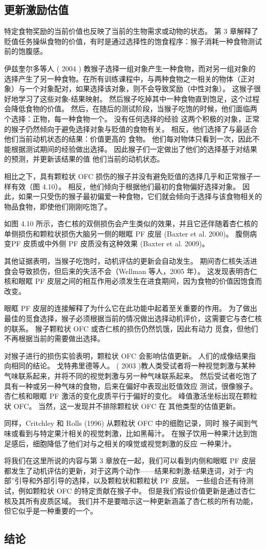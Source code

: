 \subsection{更新激励估值}
特定食物奖励的当前价值也反映了当前的生物需求或动物的状态。 第 3 章解释了贬值任务操纵食物的价值，有时是通过选择性的饱食程序：猴子消耗一种食物测试前的饱腹感。\par
伊兹奎尔多等人 ( 2004 ) 教猴子选择一组对象产生一种食物，而对另一组对象的选择产生了另一种食物。在所有训练课程中，与两种食物之一相关的物体（正对象）与一个对象配对，如果选择该对象，则不会导致奖励（中性对象）。 这猴子很好地学习了这些对象-结果映射。 然后猴子吃掉其中一种食物直到饱足，这个过程会降低食物的价值。 然后，在随后的测试阶段，当猴子吃饱的时候，他们面临两个选择：正物，每一种食物一个。 没有任何选择的经验
这两个积极的对象，正常的猴子仍然倾向于避免选择对象与贬值的食物有关。 相反，他们选择了与最适合他们当前动机状态的结果：价值更高的
食物。 他们每对物体只看到一次，因此不能根据测试期间的经验做出选择。 因此猴子们一定做出了他们的选择基于对结果的预测，并更新该结果的值
他们当前的动机状态。\par
相比之下，具有颗粒状 OFC 损伤的猴子并没有避免贬值的选择几乎和正常猴子一样有效（图 4.10）。 相反，他们倾向于根据他们最初的食物偏好选择对象。 因此，如果一只受伤的猴子最初偏爱一种食物，它们就会倾向于选择与该食物相关的物品食物，即使他们刚刚吃饱了。\par
如图 4.10 所示，杏仁核的双侧损伤会产生类似的效果，并且它还伴随着杏仁核的单侧损伤和颗粒状损伤大脑另一侧的眼眶 PF 皮层 (Baxter et al. 2000)。 腹侧病变PF 皮质或中外侧 PF 皮质没有这种效果 (Baxter et al. 2009)。\par
其他证据表明，当猴子吃饱时，动机评估的更新会自动发生。 期间杏仁核失活进食会导致损伤，但后来的失活不会（Wellman 等人，2005 年）。 这发现表明杏仁核和眼眶 PF 皮层之间的相互作用必须发生在进食期间，因为食物的价值因饱食而改变。\par
眼眶 PF 皮层的连接解释了为什么它在此功能中起着至关重要的作用。 为了做出最佳的觅食选择，猴子必须根据当前的情况做出选择动机评价，这需要它与杏仁核的联系。 猴子颗粒状 OFC 或杏仁核的损伤仍然饥饿，因此有动力
觅食，但他们不再根据当前的需要做出选择。\par
对猴子进行的损伤实验表明，颗粒状 OFC 会影响估值更新。 人们的成像结果指向相同的结论。 戈特弗里德等人。 ( 2003 )教人类受试者将一种视觉刺激与某种气味联系起来，并将不同的视觉刺激与另一种气味联系起来。 然后受试者吃饱了具有一种或另一种气味的食物，后来在偏好中表现出贬值效应
测试，很像猴子。 杏仁核和眼眶 PF 激活的变化皮质平行于偏好的变化。 峰值激活坐标出现在颗粒状 OFC。 当然，这一发现并不排除颗粒状 OFC 在
其他类型的估值更新。\par
同样，Critchley 和 Rolls (1996) 从颗粒状 OFC 中的细胞记录，同时
猴子闻到气味或看到与特定果汁相关的视觉刺激，比如黑莓汁。 在猴子饮用一种果汁达到饱足感后，细胞降低了他们对与之相关的嗅觉或视觉刺激的反应
一种果汁。\par
将我们在这里所说的内容与第 3 章放在一起，我们可以看到内侧和眼眶 PF 皮层都发生了动机评估的更新，对于这两个动作——结果和刺激-结果连词，对于“内部”引导和外部引导的选择，以及颗粒状和颗粒状 PF 皮层。 一些组合还有待测试，例如颗粒状 OFC 的特定贡献在猴子中。 但是我们假设价值更新是通过杏仁核及其所有皮质区域。 我们并不是要暗示这一种更新涵盖了杏仁核的所有功能，但它似乎是一种重要的一个。\par
\subsection{结论}



